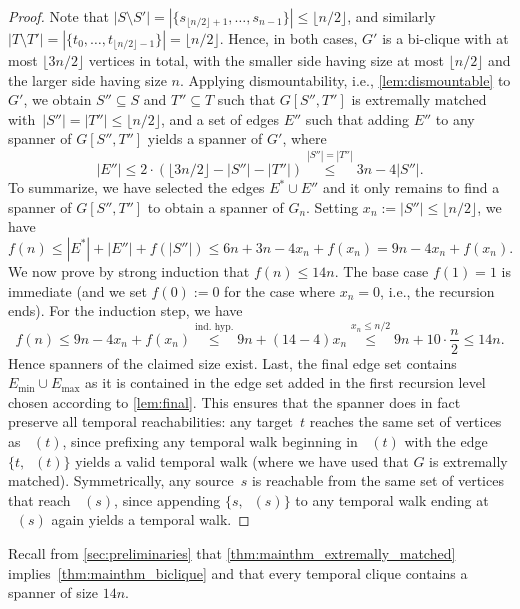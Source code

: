 \documentclass[11pt, letterpaper]{article}
\renewcommand{\subset}{\subseteq}
\DeclareMathOperator{\minmat}{N_{\mathrm{min}}}
\DeclareMathOperator{\maxmat}{N_{\mathrm{max}}}
\newcommand{\minedges}{E_{\mathrm{min}}}
\newcommand{\maxedges}{E_{\mathrm{max}}}
\theoremstyle{definition}
\theoremstyle{plain}
\begin{document}
\begin{proof}
Note that $|S \setminus S'| = |\{s_{\lfloor n/2 \rfloor +1}, \dots, s_{n-1}\}| \leq \lfloor n/2 \rfloor$, and similarly $|T \setminus T'| = |\{t_0, \ldots, t_{\lfloor n/2 \rfloor -1}\}| = \lfloor n/2 \rfloor$.
Hence, in both cases, $G'$ is a bi-clique with at most $\lfloor 3n/2 \rfloor$ vertices in total, with the smaller side having size at most $\lfloor n/2 \rfloor$ and the larger side having size $n$.
Applying dismountability, i.e., \cref{lem:dismountable} to $G'$, we obtain $S''\subset S$ and $T''\subset T$ such that $G[S'',T'']$ is extremally matched with~$|S''|=|T''|\leq \lfloor n/2 \rfloor$, and a set of edges $E''$ such that adding $E''$ to any spanner of $G[S'',T'']$ yields a spanner of $G'$, where
\begin{equation*}
|E''|\leq 2\cdot (\lfloor 3n/2 \rfloor - |S''|-|T''|)
\overset{|S''|=|T''|}{\leq}3n - 4|S''|.
\end{equation*}
To summarize, we have selected the edges $E^*\cup E''$ and it only remains to find a spanner of $G[S'',T'']$ to obtain a spanner of $G_n$.
Setting $x_n := |S''| \leq \lfloor n/2 \rfloor$, we have
\begin{equation*}
f(n)\leq |E^*|+|E''|+f(|S''|)
\leq
6n + 3n - 4x_n + f(x_n)
=9n- 4x_n + f(x_n).
\end{equation*}
We now prove by strong induction that $f(n)\leq 14n$. The base case $f(1)=1$ is immediate (and we set $f(0):=0$ for the case where $x_n=0$, i.e., the recursion ends). For the induction step, we have
\begin{equation*}
f(n)\leq 9n-4x_n+f(x_n)
\overset{\text{ind.~hyp.}}{\leq} 9n + (14-4)x_n 
\overset{x_n\leq n/2}{\leq}
 9n + 10 \cdot \frac{n}{2} \leq 14n.
\end{equation*}
Hence spanners of the claimed size exist.
Last, the final edge set contains $\minedges \cup \maxedges$ as it is contained in the edge set added in the first recursion level chosen according to \cref{lem:final}. This ensures that the spanner does in fact preserve all temporal reachabilities: any target~$t$ reaches the same set of vertices as $\minmat(t)$, since prefixing any temporal walk beginning in $\minmat(t)$ with the edge $\{t, \minmat(t)\}$ yields a valid temporal walk (where we have used that $G$ is extremally matched). Symmetrically, any source~$s$ is reachable from the same set of vertices that reach $\maxmat(s)$, since appending $\{s, \maxmat(s)\}$ to any temporal walk ending at $\maxmat(s)$ again yields a temporal walk.
\end{proof}

Recall from \cref{sec:preliminaries} that \cref{thm:mainthm_extremally_matched} implies~\cref{thm:mainthm_biclique} and that every temporal clique contains a spanner of size $14n$.
\end{document}
